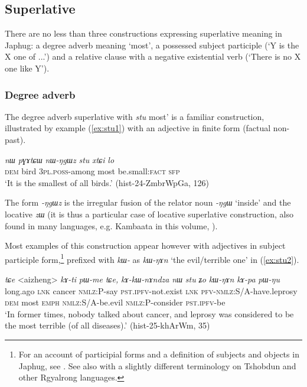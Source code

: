 \documentclass[oneside,a4paper,11pt]{article}
\newcommand{\ipa}[1]{{\phon\textit{#1}}}
\begin{document}
\subsection{Superlative}
There are no less than three constructions expressing superlative meaning in Japhug: a degree adverb meaning `most', a possessed subject participle (`Y is the X one of ...') and a relative clause with a negative existential verb (`There is no X one like Y').

 \subsubsection{Degree adverb}
 The degree adverb superlative with \ipa{stu}  most' is a familiar construction, illustrated by example (\ref{ex:stu1}) with an adjective in finite form (factual non-past).  
 
\begin{exe}
\ex \label{ex:stu1}
\gll 
\ipa{nɯ} 	\ipa{pɣɤtɕɯ} 	\ipa{nɯ-ŋgɯz} 	\ipa{stu} 	\ipa{xtɕi} 	\ipa{lo} \\
\textsc{dem} bird \textsc{3pl.poss-}among most be.small:\textsc{fact} \textsc{sfp} \\
\glt `It is the smallest of all birds.' (hist-24-ZmbrWpGa, 126)
\end{exe}

The form \ipa{-ŋgɯz} is the irregular fusion of the relator noun \ipa{-ŋgɯ} `inside' and the locative \ipa{zɯ} (it is thus a particular case of locative superlative construction, also found in many languages, e.g. Kambaata in this volume, \citealt{treis17comparison}). 

Most examples of this construction appear however with adjectives in subject participle form,\footnote{For an account of participial forms and a definition of subjects and objects in Japhug, see \citet{jacques16relatives, jacques16complementation}. See also \citet{jackson03caodeng, jackson14morpho} with a slightly different terminology on Tshobdun and other Rgyalrong languages.} prefixed with \ipa{kɯ-} as 	\ipa{kɯ-ŋɤn} `the evil/terrible one' in (\ref{ex:stu2}).

\begin{exe}
\ex \label{ex:stu2}
\gll \ipa{kɯɕɯŋgɯ} 	\ipa{tɕe} 	<aizheng> 	\ipa{kɤ-ti} 	\ipa{pɯ-me} 	\ipa{tɕe,} 	\ipa{kɤ-kɯ-nɤndza} 	\ipa{nɯ} 	\ipa{stu} 	\ipa{ʑo} 	\ipa{kɯ-ŋɤn} 	\ipa{kɤ-pa} 	\ipa{pɯ-ŋu} \\
long.ago \textsc{lnk} cancer \textsc{nmlz}:P-say \textsc{pst.ipfv}-not.exist \textsc{lnk} \textsc{pfv}-\textsc{nmlz}:S/A-have.leprosy \textsc{dem} most \textsc{emph} \textsc{nmlz}:S/A-be.evil \textsc{nmlz}:P-consider \textsc{pst.ipfv}-be \\
\glt `In former times, nobody talked about cancer, and leprosy was considered to be the most terrible (of all diseases).' (hist-25-khArWm, 35)
\end{exe}
\end{document}
